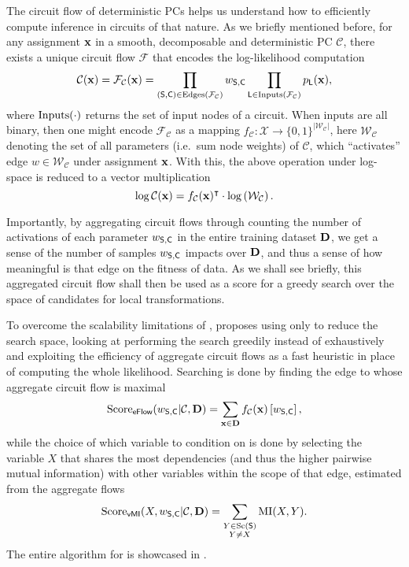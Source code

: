 The circuit flow of deterministic PCs helps us understand how to efficiently compute inference in
circuits of that nature. As we briefly mentioned before, for any assignment $\mathbf{x}$ in a smooth,
decomposable and deterministic PC $\mathcal{C}$, there exists a unique circuit flow $\mathcal{F}$
that encodes the log-likelihood computation
\begin{equation}
  \mathcal{C}(\mathbf{x})=\mathcal{F}_\mathcal{C}(\mathbf{x})=\prod_{(\operatorname{\textup{\textsf{S}}},\operatorname{\textup{\textsf{C}}})\in
  \operatorname{\normalfont{Edges}}(\mathcal{F}_\mathcal{C})}w_{\operatorname{\textup{\textsf{S}}},\operatorname{\textup{\textsf{C}}}}\prod_{\operatorname{\textup{\textsf{L}}}\in\operatorname{\normalfont{Inputs}}(\mathcal{F}_\mathcal{C})}
  p_{\operatorname{\textup{\textsf{L}}}}(\mathbf{x}),
\end{equation}
where $\operatorname{\normalfont{Inputs}}(\cdot)$ returns the set of input nodes of a circuit. When inputs are all binary,
then one might encode $\mathcal{F}_\mathcal{C}$ as a mapping $f_\mathcal{C}:\mathcal{X}\to
\{0,1\}^{|\mathcal{W}_\mathcal{C}|}$, here $\mathcal{W}_\mathcal{C}$ denoting the set of all
parameters (i.e.\ sum node weights) of $\mathcal{C}$, which ``activates'' edge
$w\in\mathcal{W}_\mathcal{C}$ under assignment $\mathbf{x}$. With this, the above operation under
log-space is reduced to a vector multiplication
\begin{equation}
  \log\mathcal{C}(\mathbf{x})=f_\mathcal{C}(\mathbf{x})^\intercal\cdot\log\left(\mathcal{W}_\mathcal{C}\right).
\end{equation}

Importantly, by aggregating circuit flows through counting the number of activations of each
parameter $w_{\operatorname{\textup{\textsf{S}}},\operatorname{\textup{\textsf{C}}}}$ in the entire training dataset $\mathbf{D}$, we get a sense of the number
of samples $w_{\operatorname{\textup{\textsf{S}}},\operatorname{\textup{\textsf{C}}}}$ impacts over $\mathbf{D}$, and thus a sense of how meaningful is that
edge on the fitness of data. As we shall see briefly, this aggregated circuit flow shall then be
used as a score for a greedy search over the space of candidates for local transformations.

To overcome the scalability limitations of ,  proposes using
only  to reduce the search space, looking at performing the search greedily instead
of exhaustively and exploiting the efficiency of aggregate circuit flows as a fast heuristic in
place of computing the whole likelihood. Searching is done by finding the edge to 
whose aggregate circuit flow is maximal
\begin{equation}
  \operatorname{\normalfont{Score}}_{\textsf{eFlow}}(w_{\operatorname{\textup{\textsf{S}}},\operatorname{\textup{\textsf{C}}}}|\mathcal{C},\mathbf{D})=\sum_{\mathbf{x}\in\mathbf{D}}f_{\mathcal{C}}(\mathbf{x})\left[w_{\operatorname{\textup{\textsf{S}}},\operatorname{\textup{\textsf{C}}}}\right],
\end{equation}
while the choice of which variable to condition  on is done by selecting the
variable $X$ that shares the most dependencies (and thus the higher pairwise mutual information)
with other variables within the scope of that edge, estimated from the aggregate flows
\begin{equation}
  \operatorname{\normalfont{Score}}_{\textsf{vMI}}(X,w_{\operatorname{\textup{\textsf{S}}},\operatorname{\textup{\textsf{C}}}}|\mathcal{C},\mathbf{D})=\sum_{\substack{Y\in\operatorname*{\normalfont{Sc}}(\operatorname{\textup{\textsf{S}}})\\Y\neq
    X}}\operatorname{\normalfont{MI}}(X,Y).
\end{equation}
The entire algorithm for  is showcased in .

